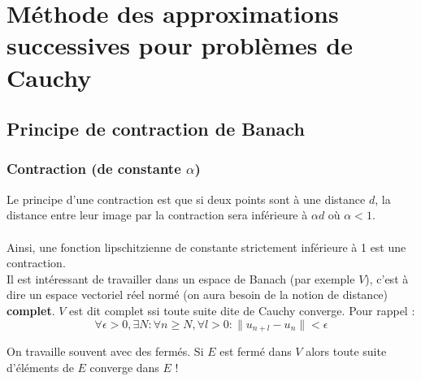 \chapter{Méthode des approximations successives pour problèmes de Cauchy}

\setcounter{section}{3}
\section{Principe de contraction de Banach}
	 \subsection{Contraction (de constante $\alpha$)}
	 Le principe d'une contraction est que si deux points sont à une 
	 distance $d$, la distance entre leur image par la contraction 
	 sera inférieure à $\alpha d$ où $\alpha<1$.\\
	 	 
	 \ \\
	 Ainsi, une fonction lipschitzienne de constante strictement inférieure à
	 1 est une contraction.\\
	 
	 Il est intéressant de travailler dans un espace de Banach (par exemple $V$), 
	 c'est à dire un espace vectoriel réel normé (on aura besoin de la notion de 
	 distance) \textbf{complet}. $V$ est dit complet ssi toute suite dite de Cauchy 
	 converge. Pour rappel :
	 \begin{equation}
	 \forall \epsilon> 0, \exists N : \forall n \geq N, \forall l > 0 : \| 
	 u_{n+l}-u_n\| < \epsilon
	 \end{equation}
	
	On travaille souvent avec des fermés. Si $E$ est fermé dans $V$ alors 
	toute suite d’éléments de $E$ converge dans $E$ !
	
